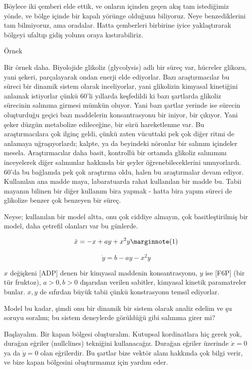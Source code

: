 \documentclass[12pt,fleqn]{article}\usepackage{../../common}
\begin{document}
Böylece iki çemberi elde ettik, ve onların içinden geçen akış tam istediğimiz
yönde, ve bölge içinde bir kapalı yörünge olduğunu biliyoruz. Neye
benzediklerini tam bilmiyoruz, ama oradalar. Hatta çemberleri birbirine iyice
yaklaştırarak bölgeyi ufaltıp gidiş yolunu oraya kıstırabiliriz.

Örnek

Bir örnek daha. Biyolojide glikoliz (glycolysis) adlı bir süreç var, hücreler
glikozu, yani şekeri, parçalayarak ondan enerji elde ediyorlar. Bazı
araştırmacılar bu süreci bir dinamik sistem olarak inceliyorlar, yani glikolizin
kimyasal kinetiğini anlamak istiyorlar çünkü 60'li yıllarda keşfedildi ki bazı
şartlarda glikoliz sürecinin salınıma girmesi mümkün oluyor. Yani bazı şartlar
yerinde ise sürecin oluşturduğu geçici bazı maddelerin konsantrasyonu bir
iniyor, bir çıkıyor. Yani şeker düzgün metabolize edileceğine, bir sürü
hareketlenme var. Bu araştırmacılara çok ilginç geldi, çünkü zaten vücuttaki pek
çok diğer ritmi de anlamaya uğraşıyorlardı; kalpte, ya da beyindeki nöronlar bir
salınım içindeler mesela. Araştırmacılar daha basit, kontrollü bir ortamda
glikoliz salınımını inceyelerek diğer salınımlar hakkında bir şeyler
öğrenebileceklerini umuyorlardı. 60'da bu bağlamda pek çok araştırma oldu, halen
bu araştırmalar devam ediyor. Kullanılan ana madde maya, labaratuarda rahat
kullanılan bir madde bu. Tabii mayanın bilinen bir diğer kullanım bira yapmak -
hatta bira yapım süreci de glikolize benzer çok benzeyen bir süreç.

Neyse; kullanılan bir model altta, onu çok ciddiye almayın, çok basitleştirilmiş
bir model, daha çetrefil olanları var bu günlerde.

$$ \dot{x} = -x + ay + x^2y 
\mlabel{1} $$

$$ \dot{y} = b - ay - x^2y $$

$x$ değişkeni [ADP] denen bir kimyasal maddenin konsantrasyonu, $y$ ise [F6P]
(bir tür fruktoz), $a>0,b>0$ dışarıdan verilen sabitler, kimyasal kinetik
paramatreler bunlar. $x,y$ de sıfırdan büyük tabii çünkü konstrasyonu temsil
ediyorlar. 

Model bu kadar, şimdi onu bir dinamik bir sistem olarak analiz edelim ve şu
soruyu soralım; bu sistem deneylerde görüldüğü gibi salınıma girer mi?

Başlayalım. Bir kapan bölgesi oluşturalım.  Kutupsal kordinatlara hiç gerek yok,
durağan eğriler (nullclines) tekniğini kullanacağız. Durağan eğriler üzerinde
$\dot{x}=0$ ya da $\dot{y}=0$ olan eğrilerdir. Bu şartlar bize vektör alanı
hakkında çok bilgi verir, ve bize kapan bölgesini oluşturmamız için yardım eder.
\end{document}
